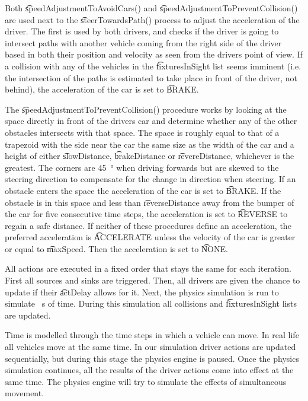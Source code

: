 Both \t{speedAdjustmentToAvoidCars()} and \t{speedAdjustmentToPreventCollision()} are used next to the \t{steerTowardsPath()} process to adjust the acceleration of the driver. The first is used by both drivers, and checks if the driver is going to intersect paths with another vehicle coming from the right side of the driver based in both their position and velocity as seen from the drivers point of view. If a collision with any of the vehicles in the \t{fixturesInSight} list seems imminent (i.e. the intersection of the paths is estimated to take place in front of the driver, not behind), the acceleration of the car is set to \t{BRAKE}.

The \t{speedAdjustmentToPreventCollision()} procedure works by looking at the space directly in front of the drivers car and determine whether any of the other obstacles intersects with that space. The space is roughly equal to that of a trapezoid with the side near the car the same size as the width of the car and a height of either \t{slowDistance}, \t{brakeDistance} or \t{revereDistance}, whichever is the greatest. The corners are \si{45 \degree} when driving forwards but are skewed to the steering direction to compensate for the change in direction when steering. If an obstacle enters the space the acceleration of the car is set to \t{BRAKE}. If the obstacle is in this space and less than \t{reverseDistance} away from the bumper of the car for five consecutive time steps, the acceleration is set to \t{REVERSE} to regain a safe distance.
If neither of these procedures define an acceleration, the preferred acceleration is \t{ACCELERATE} unless the velocity of the car is greater or equal to \t{maxSpeed}. Then the acceleration is set to \t{NONE}.

All actions are executed in a fixed order that stays the same for each iteration. First all sources and sinks are triggered. Then, all drivers are given the chance to update if their \t{actDelay} allows for it. Next, the physics simulation is run to simulate \si{ \second} of time. During this simulation all collisions and \t{fixturesInSight} lists are updated.

Time is modelled through the time steps in which a vehicle can move. In real life all vehicles move at the same time. In our simulation driver actions are updated sequentially, but during this stage the physics engine is paused. Once the physics simulation continues, all the results of the driver actions come into effect at the same time. The physics engine will try to simulate the effects of simultaneous movement.